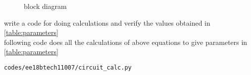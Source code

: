 \begin{enumerate}[label=\thesubsection.\arabic*.,ref=\thesubsection.\theenumi]
{\begin{figure}[!ht]
\begin{center}
		\resizebox{\columnwidth}{!}{}
	\end{center}
\caption{block diagram}
\label{fig:block_diagram}
\end{figure}
\item write a code for doing calculations and verify the values obtained in \ref{table:parameters} 
\\
\solution 
following code does all the calculations of above equations to give parameters in
\ref{table:parameters} 
\begin{lstlisting}
codes/ee18btech11007/circuit_calc.py
\end{lstlisting}
}%



\end{enumerate}

